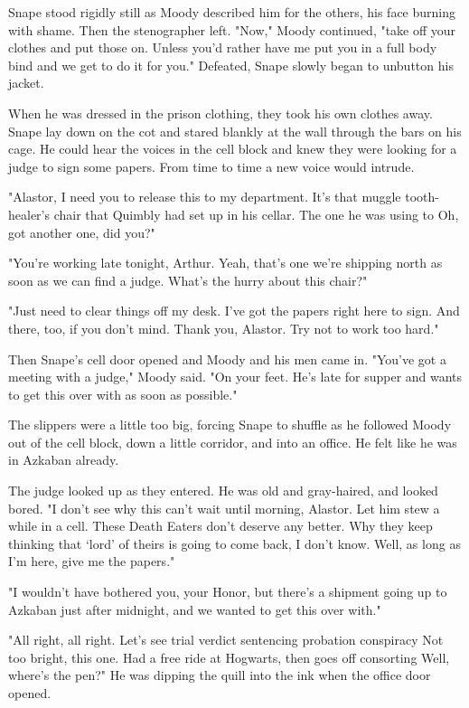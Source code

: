 Snape stood rigidly still as Moody described him for the others, his face burning with shame. Then the stenographer left. "Now," Moody continued, "take off your clothes and put those on. Unless you'd rather have me put you in a full body bind and we get to do it for you." Defeated, Snape slowly began to unbutton his jacket.

When he was dressed in the prison clothing, they took his own clothes away. Snape lay down on the cot and stared blankly at the wall through the bars on his cage. He could hear the voices in the cell block and knew they were looking for a judge to sign some papers. From time to time a new voice would intrude.

"Alastor, I need you to release this to my department. It's that muggle tooth-healer's chair that Quimbly had set up in his cellar. The one he was using to{\el} Oh, got another one, did you?"

"You're working late tonight, Arthur. Yeah, that's one we're shipping north as soon as we can find a judge. What's the hurry about this chair?"

"Just need to clear things off my desk. I've got the papers right here to sign. And there, too, if you don't mind. Thank you, Alastor. Try not to work too hard."

Then Snape's cell door opened and Moody and his men came in. "You've got a meeting with a judge," Moody said. "On your feet. He's late for supper and wants to get this over with as soon as possible."

The slippers were a little too big, forcing Snape to shuffle as he followed Moody out of the cell block, down a little corridor, and into an office. He felt like he was in Azkaban already.

The judge looked up as they entered. He was old and gray-haired, and looked bored. "I don't see why this can't wait until morning, Alastor. Let him stew a while in a cell. These Death Eaters don't deserve any better. Why they keep thinking that `lord' of theirs is going to come back, I don't know. Well, as long as I'm here, give me the papers."

"I wouldn't have bothered you, your Honor, but there's a shipment going up to Azkaban just after midnight, and we wanted to get this over with."

"All right, all right. Let's see{\el} trial{\el} verdict{\el} sentencing{\el} probation{\el} conspiracy{\el} Not too bright, this one. Had a free ride at Hogwarts, then goes off consorting{\el} Well, where's the pen?" He was dipping the quill into the ink when the office door opened.

